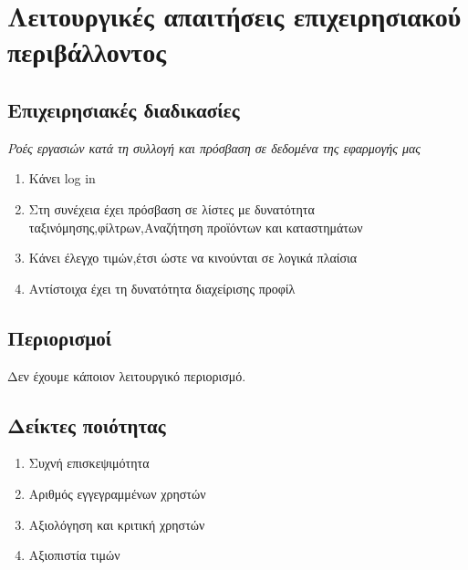 \section{Λειτουργικές απαιτήσεις επιχειρησιακού περιβάλλοντος}



\subsection{Επιχειρησιακές διαδικασίες}
\textit{Ροές εργασιών κατά τη συλλογή και πρόσβαση σε δεδομένα της εφαρμογής μας}


\begin{enumerate}
	\item Κάνει log in
	\item Στη συνέχεια έχει πρόσβαση σε λίστες με δυνατότητα ταξινόμησης,φίλτρων,Αναζήτηση προϊόντων και καταστημάτων
	\item Κάνει έλεγχο τιμών,έτσι ώστε να κινούνται σε λογικά πλαίσια
	\item Αντίστοιχα έχει τη δυνατότητα διαχείρισης προφίλ
\end{enumerate}



\subsection{Περιορισμοί}
Δεν έχουμε κάποιον λειτουργικό περιορισμό.


\subsection{Δείκτες ποιότητας}
\begin{enumerate}
	\item Συχνή επισκεψιμότητα
	\item Αριθμός εγγεγραμμένων χρηστών 
	\item Αξιολόγηση και κριτική χρηστών
	\item Αξιοπιστία τιμών
\end{enumerate}
